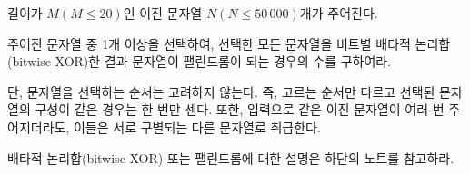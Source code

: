 길이가 $M(M \le 20)$인 이진 문자열 $N(N \le 50\, 000)$개가 주어진다.

주어진 문자열 중 1개 이상을 선택하여, 선택한 모든 문자열을 비트별 배타적 논리합(bitwise XOR)한 결과 문자열이 팰린드롬이 되는 경우의 수를 구하여라.

단, 문자열을 선택하는 순서는 고려하지 않는다. 즉, 고르는 순서만 다르고 선택된 문자열의 구성이 같은 경우는 한 번만 센다. 또한, 입력으로 같은 이진 문자열이 여러 번 주어지더라도, 이들은 서로 구별되는 다른 문자열로 취급한다.

배타적 논리합(bitwise XOR) 또는 팰린드롬에 대한 설명은 하단의 노트를 참고하라.